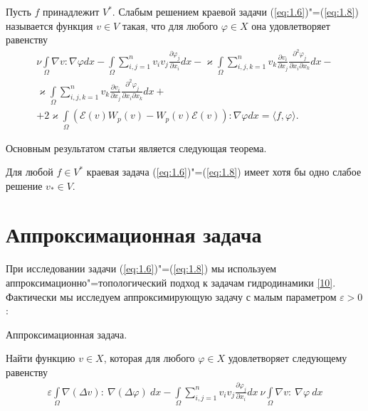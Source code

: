 \begin{definition}
    Пусть $f$ принадлежит $V^*$. Слабым решением краевой задачи (\ref{eq:1.6})"=(\ref{eq:1.8}) называется функция $v\in V$ такая,
    что для любого $\varphi \in X$ она удовлетворяет равенству
    \begin{equation}\label{eq:2.1}
        \begin{gathered}
            \nu\int\limits_{\Omega}\nabla v: \nabla \varphi dx-\int\limits_{\Omega} \sum_{i,j=1}^n v_iv_j\frac{\partial \varphi_j}
            {\partial x_i}dx-\varkappa\int\limits_{\Omega}\sum_{i,j,k=1}^n v_k\frac{\partial v_i}{\partial x_j}\frac{\partial^2 \varphi_j}{\partial x_i\partial x_k}dx- \\
            \varkappa\int\limits_{\Omega}\sum_{i,j,k=1}^n v_k\frac{\partial v_i}{\partial x_j}\frac{\partial^2 \varphi_j}
            {\partial x_i\partial x_k}dx+\\
            +2\varkappa\int\limits_{\Omega}(\mathcal{E}(v)W_p(v)-W_p(v)\mathcal{E}(v)):
            \nabla\varphi dx=\langle f,\varphi \rangle.
        \end{gathered}
    \end{equation}
\end{definition}
Основным результатом статьи является следующая теорема.

\begin{theorem}\label{th:2.1}
    Для любой $f\in V^*$ краевая задача (\ref{eq:1.6})"=(\ref{eq:1.8}) имеет хотя бы одно слабое решение $v_*\in V$.
\end{theorem}

\section{Аппроксимационная задача}
При исследовании задачи (\ref{eq:1.6})"=(\ref{eq:1.8}) мы используем аппроксимационно"=топологический подход к задачам гидродинамики \hyperlink{L10}{[10]}.
Фактически мы исследуем аппроксимирующую задачу с малым параметром $\varepsilon > 0$:

Аппроксимационная задача.

Найти функцию $v \in X$, которая для любого $\varphi \in X$ удовлетворяет следующему равенству
\begin{equation*}
    \begin{gathered}
        \varepsilon \int\limits_\Omega \nabla(\Delta v): \ \nabla(\Delta\varphi) \ dx -
        \int\limits_\Omega \sum_{i,j=1}^n v_i v_j \frac{\partial \varphi_j}{\partial x_i} dx \ \nu
        \int\limits_\Omega \nabla v: \ \nabla \varphi \ dx
    \end{gathered}
\end{equation*}

